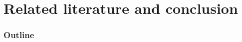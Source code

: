 \documentclass[aspectratio=169, 10pt]{beamer}
\theoremstyle{definition}
\theoremstyle{plain}
\begin{document}
%

\section{Related literature and conclusion}

\begin{frame}
  \frametitle{Outline}
  \tableofcontents[currentsection]
\end{frame}
\end{document}

